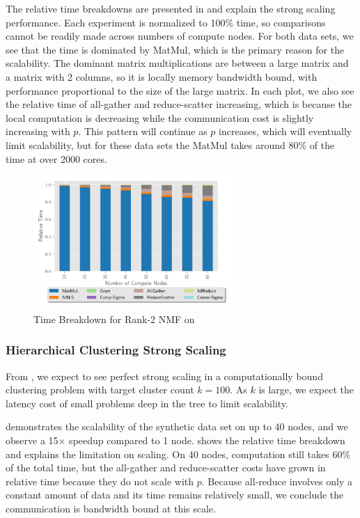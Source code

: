 The relative time breakdowns are presented in  and explain the strong scaling performance.
Each experiment is normalized to 100\% time, so comparisons cannot be readily made across numbers of compute nodes. 
For both data sets, we see that the time is dominated by MatMul, which is the primary reason for the scalability.
The dominant matrix multiplications are between a large matrix and a matrix with 2 columns, so it is locally memory bandwidth bound, with performance proportional to the size of the large matrix.
In each plot, we also see the relative time of all-gather and reduce-scatter increasing, which is because the local computation is decreasing while the communication cost is slightly increasing with $p$.
This pattern will continue as $p$ increases, which will eventually limit scalability, but for these data sets the MatMul takes around 80\% of the time at over 2000 cores.

\begin{figure}
\begin{center}
\includegraphics[height=2in, width=\columnwidth]{plots/realworld_rank2_strongscaling.pdf}
\caption{Time Breakdown for Rank-2 NMF on \image{}}
\label{fig:rwrank2strongscaling}
\end{center}
\end{figure}


\subsubsection{Hierarchical Clustering Strong Scaling}
\label{sec:hiernmf2scaling}

From , we expect to see perfect strong scaling in a computationally bound clustering problem with target cluster count $k=100$.
As $k$ is large, we expect the latency cost of small problems deep in the tree to limit scalability.

 demonstrates the scalability of the synthetic data set on up to 40 nodes, and we observe a 15$\times$ speedup compared to 1 node.
 shows the relative time breakdown and explains the limitation on scaling.
On 40 nodes, computation still takes 60\% of the total time, but the all-gather and reduce-scatter costs have grown in relative time because they do not scale with $p$.
Because all-reduce involves only a constant amount of data and its time remains relatively small, we conclude the communication is bandwidth bound at this scale.

